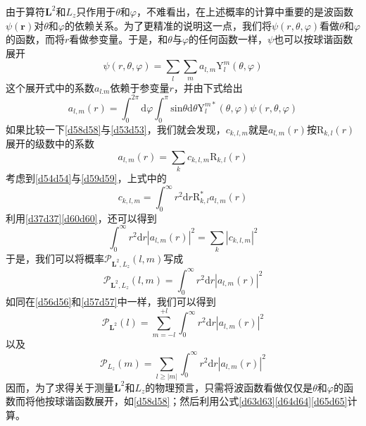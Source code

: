 \documentclass[]{article}
\begin{document}
由于算符$\boldsymbol{L}^2$和$L_z$只作用于$\theta$和$\varphi$，不难看出，在上述概率的计算中重要的是波函数$\psi(\boldsymbol{r})$对$\theta$和$\varphi$的依赖关系。为了更精准的说明这一点，我们将$\psi(r,\theta,\varphi)$看做$\theta$和$\varphi$的函数，而将$r$看做参变量。于是，和$\theta$与$\varphi$的任何函数一样，$\psi$也可以按球谐函数展开
\begin{equation}
	\psi(r,\theta,\varphi)=\sum\limits_{l}\sum\limits_{m}a_{l,m}\mathrm{Y}_l^m(\theta,\varphi)
	\label{d58d58}
\end{equation}
这个展开式中的系数$a_{l.m}$依赖于参变量$r$，并由下式给出
\begin{equation}
	a_{l,m}(r)=\int_{0}^{2\pi}\mathrm{d}\varphi\int_{0}^{\pi}\mathrm{sin}\theta\mathrm{d}\theta\mathrm{Y}_l^{m*}(\theta,\varphi)\psi(r,\theta,\varphi)
	\label{d59d59}
\end{equation}
如果比较一下\eqref{d58d58}与\eqref{d53d53}，我们就会发现，$c_{k,l,m}$就是$a_{l,m}(r)$按$\mathrm{R}_{k,l}(r)$展开的级数中的系数
\begin{equation}
	a_{l,m}(r)=\sum\limits_{k}c_{k,l,m}\mathrm{R}_{k,l}(r)
	\label{d60d60}
\end{equation}
考虑到\eqref{d54d54}与\eqref{d59d59}，上式中的
\begin{equation}
	c_{k,l,m}=\int_{0}^{\infty}r^2\mathrm{d}r\mathrm{R}^*_{k,l}a_{l,m}(r)
\end{equation}
利用\eqref{d37d37}\eqref{d60d60}，还可以得到
\begin{equation}
	\int_{0}^{\infty}r^2\mathrm{d}r|a_{l,m}(r)|^2=\sum\limits_{k}|c_{k,l,m}|^2
\end{equation}
于是，我们可以将概率$\mathscr{P}_{\boldsymbol{L}^2,L_z}(l,m)$写成
\begin{equation}
	\mathscr{P}_{\boldsymbol{L}^2,L_z}(l,m)=\int_{0}^{\infty}r^2\mathrm{d}r|a_{l,m}(r)|^2
	\label{d63d63}
\end{equation}
如同在\eqref{d56d56}和\eqref{d57d57}中一样，我们可以得到
\begin{equation}
	\mathscr{P}_{\boldsymbol{L}^2}(l)=\sum\limits_{m=-l}^{+l}\int_{0}^{\infty}r^2\mathrm{d}r|a_{l,m}(r)|^2
	\label{d64d64}
\end{equation}
以及
\begin{equation}
	\mathscr{P}_{L_z}(m)=\sum\limits_{l\geqslant|m|}\int_{0}^{\infty}r^2\mathrm{d}r|a_{l,m}(r)|^2
	\label{d65d65}
\end{equation}
因而，为了求得关于测量$\boldsymbol{L}^2$和$L_z$的物理预言，只需将波函数看做仅仅是$\theta$和$\varphi$的函数而将他按球谐函数展开，如\eqref{d58d58}；然后利用公式\eqref{d63d63}\eqref{d64d64}\eqref{d65d65}计算。\par 
\end{document}
